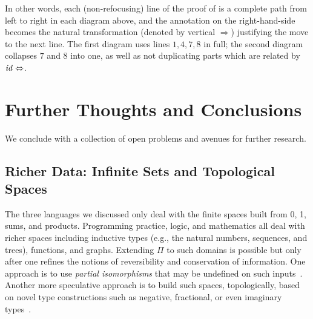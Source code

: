 \documentclass{article}
\newcommand{\swapp}{\ensuremath{\mathit{swap}_+}}
\newcommand{\assoclp}{\ensuremath{\mathit{assocl}_+}}
\newcommand{\assocrp}{\ensuremath{\mathit{assocr}_+}}
\begin{document}
\vspace*{3mm}

In other words, each (non-refocusing) line of the proof of
\; is a complete path 
from left to right in each diagram above, and the annotation
on the right-hand-side becomes the natural transformation (denoted
by vertical $\Rightarrow$) justifying the move to the next line.
The first diagram uses lines $1,4,7,8$ in full; the second
diagram collapses $7$ and $8$ into one, as well as not duplicating
parts which are related by $\mathit{id}\Leftrightarrow$.

\section{Further Thoughts and Conclusions}

We conclude with a collection of open problems and avenues for further research.

\subsection{Richer Data: Infinite Sets and Topological Spaces}

The three languages we discussed only deal with the finite spaces
built from 0, 1, sums, and products. Programming practice, logic, and
mathematics all deal with richer spaces including inductive types
(e.g., the natural numbers, sequences, and trees), functions, and
graphs. Extending $\Pi$ to such domains is possible but only after one
refines the notions of reversibility and conservation of
information. One approach is to use \emph{partial isomorphisms} that
may be undefined on such inputs~\cite{infeffects,rc2011}. Another more
speculative approach is to build such spaces, topologically, based on
novel type constructions such as negative, fractional, or even
imaginary types~\cite{seventrees,roshan-thesis}.
\end{document}
